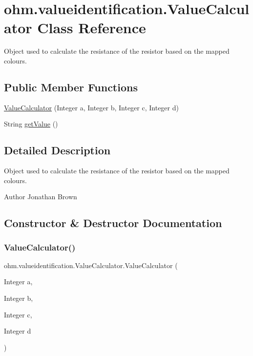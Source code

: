 \hypertarget{classohm_1_1valueidentification_1_1_value_calculator}{}\section{ohm.\+valueidentification.\+Value\+Calculator Class Reference}
\label{classohm_1_1valueidentification_1_1_value_calculator}


Object used to calculate the resistance of the resistor based on the mapped colours.  


\subsection*{Public Member Functions}
\begin{DoxyCompactItemize}
\item 
\hyperlink{classohm_1_1valueidentification_1_1_value_calculator_a8f01d25909c7b2381bb3abb3c6f7dfb4}{Value\+Calculator} (Integer a, Integer b, Integer c, Integer d)
\item 
String \hyperlink{classohm_1_1valueidentification_1_1_value_calculator_af4c4224b8750c70a5d656e6ab3e75274}{get\+Value} ()
\end{DoxyCompactItemize}


\subsection{Detailed Description}
Object used to calculate the resistance of the resistor based on the mapped colours. 

\begin{DoxyAuthor}{Author}
Jonathan Brown 
\end{DoxyAuthor}


\subsection{Constructor \& Destructor Documentation}
\hypertarget{classohm_1_1valueidentification_1_1_value_calculator_a8f01d25909c7b2381bb3abb3c6f7dfb4}{}\label{classohm_1_1valueidentification_1_1_value_calculator_a8f01d25909c7b2381bb3abb3c6f7dfb4} 
\subsubsection{\texorpdfstring{Value\+Calculator()}{ValueCalculator()}}
{\footnotesize\ttfamily ohm.\+valueidentification.\+Value\+Calculator.\+Value\+Calculator (\begin{DoxyParamCaption}\item[{Integer}]{a,  }\item[{Integer}]{b,  }\item[{Integer}]{c,  }\item[{Integer}]{d }\end{DoxyParamCaption})}


